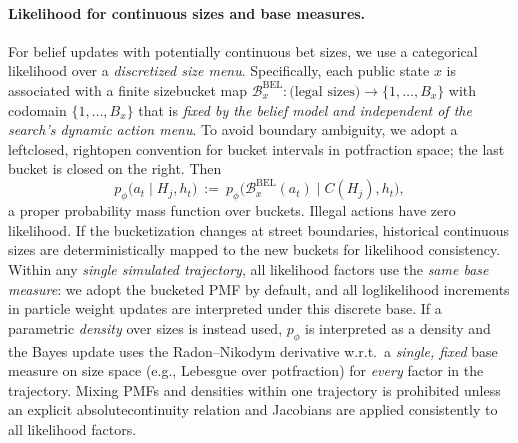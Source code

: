 \documentclass[10pt]{article}
\newcommand{\1}{\mathbf{1}}
\theoremstyle{plain}
\begin{document}
\paragraph{Likelihood for continuous sizes and base measures.}
For belief updates with potentially continuous bet sizes, we use a categorical likelihood over a \emph{discretized size menu}. Specifically, each public state $x$ is associated with a finite size\textendash bucket map $\mathcal{B}^{\mathrm{BEL}}_x:\text{(legal sizes)}\to\{1,\ldots,B_x\}$ with codomain $\{1,\ldots,B_x\}$ that is \emph{fixed by the belief model and independent of the search’s dynamic action menu}. To avoid boundary ambiguity, we adopt a left\textendash closed, right\textendash open convention for bucket intervals in pot\textendash fraction space; the last bucket is closed on the right. Then
\[
p_\phi\big(a_t\mid H_j,h_t\big)\ :=\ p_\phi\big(\mathcal{B}^{\mathrm{BEL}}_x(a_t)\mid C(H_j),h_t\big),
\]
a proper probability mass function over buckets. Illegal actions have zero likelihood. If the bucketization changes at street boundaries, historical continuous sizes are deterministically mapped to the new buckets for likelihood consistency. Within any \emph{single simulated trajectory}, all likelihood factors use the \emph{same base measure}: we adopt the bucketed PMF by default, and all log\textendash likelihood increments in particle weight updates are interpreted under this discrete base. If a parametric \emph{density} over sizes is instead used, $p_\phi$ is interpreted as a density and the Bayes update uses the Radon--Nikodym derivative w.r.t.\ a \emph{single, fixed} base measure on size space (e.g., Lebesgue over pot\textendash fraction) for \emph{every} factor in the trajectory. Mixing PMFs and densities within one trajectory is prohibited unless an explicit absolute\textendash continuity relation and Jacobians are applied consistently to all likelihood factors.
\end{document}
